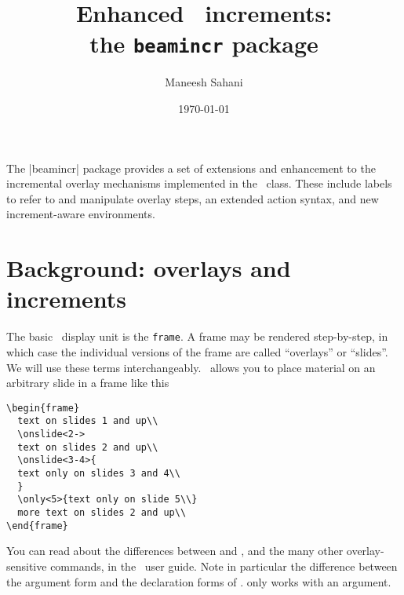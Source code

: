 \documentclass[a4paper]{ltxdoc}
\title{Enhanced \beamer\ increments:\\
the \texttt{beamincr} package}
\author{Maneesh Sahani}
\date{\today}
\begin{document}
\maketitle

\noindent
The |beamincr| package provides a set of extensions and enhancement to the
incremental overlay mechanisms implemented in the \beamer\ class.  These
include labels to refer to and manipulate overlay steps, an extended action
syntax, and new increment-aware environments.

\section{Background: overlays and increments}

The basic \beamer\ display unit is the \texttt{frame}.  A
frame may be rendered step-by-step, in which case the individual
versions of the frame are called ``overlays'' or ``slides''.  We will
use these terms interchangeably.
%
\beamer\ allows you to place material on an arbitrary slide in a frame like this
\example
\begin{verbatim}
\begin{frame}
  text on slides 1 and up\\
  \onslide<2->
  text on slides 2 and up\\
  \onslide<3-4>{
  text only on slides 3 and 4\\
  } 
  \only<5>{text only on slide 5\\}
  more text on slides 2 and up\\
\end{frame}
\end{verbatim}
You can read about the differences between 
and , and the many other overlay-sensitive
commands, in the \beamer\ user guide.  Note in particular the
difference between the argument form and the declaration forms of
.   only works with an
argument.
\end{document}
